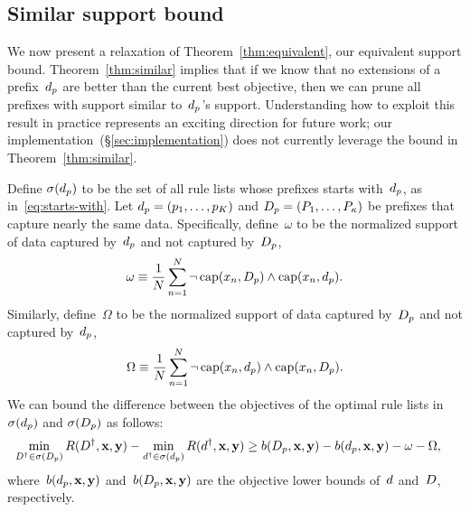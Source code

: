 \begin{arxiv}
\subsection{Similar support bound}
\label{sec:similar}

We now present a relaxation of Theorem~\ref{thm:equivalent},
our equivalent support bound.
%
Theorem~\ref{thm:similar} implies that if we know that no extensions of
a prefix~$d_p$ are better than the current best objective,
then we can prune all prefixes with support similar to~$d_p$'s support.
%
Understanding how to exploit this result in practice
represents an exciting direction for future work;
our implementation~(\S\ref{sec:implementation}) does not
currently leverage the bound in Theorem~\ref{thm:similar}.

\begin{theorem}
\label{thm:similar}
Define $\sigma(d_p)$ to be the set of all rule lists
whose prefixes starts with~$d_p$, as in~\eqref{eq:starts-with}.
%
Let ${d_p = (p_1, \dots, p_K)}$ and
${D_p = (P_1, \dots, P_{\kappa})}$ be prefixes
that capture nearly the same data.
%
Specifically, define~$\omega$ to be the normalized support
of data captured by~$d_p$ and not captured by~$D_p$, \ie
\begin{align}
\omega \equiv \frac{1}{N} \sum_{n=1}^N
  \neg\, \Cap(x_n, \PrefixB)
  \wedge \Cap(x_n, \Prefix). %
\label{eq:omega}
\end{align}
%
Similarly, define~$\Omega$ to be the normalized support
of data captured by~$D_p$ and not captured by~$d_p$, \ie
\begin{align}
\Omega \equiv \frac{1}{N} \sum_{n=1}^N
  \neg\, \Cap(x_n, \Prefix)
  \wedge \Cap(x_n, \PrefixB). %
\label{eq:big-omega}
\end{align}
We can bound the difference between the objectives of the
optimal rule lists in~$\sigma(d_p)$
and $\sigma(D_p)$ as follows:
\begin{align}
\min_{{D}^\dagger \in \sigma(D_p)} R({D}^\dagger, \mathbf{x}, \mathbf{y})
- \min_{{d}^\dagger \in \sigma(d_p)} R({d}^\dagger, \mathbf{x}, \mathbf{y})
&\ge b(D_p, \mathbf{x}, \mathbf{y}) - b(d_p, \mathbf{x}, \mathbf{y}) - \omega - \Omega,
\label{eq:similar}
\end{align}
where~$b(d_p, \mathbf{x}, \mathbf{y})$ and~$b(D_p, \mathbf{x}, \mathbf{y})$ are the
objective lower bounds of~${d}$ and~${D}$, respectively.
\end{theorem}


\end{arxiv}
